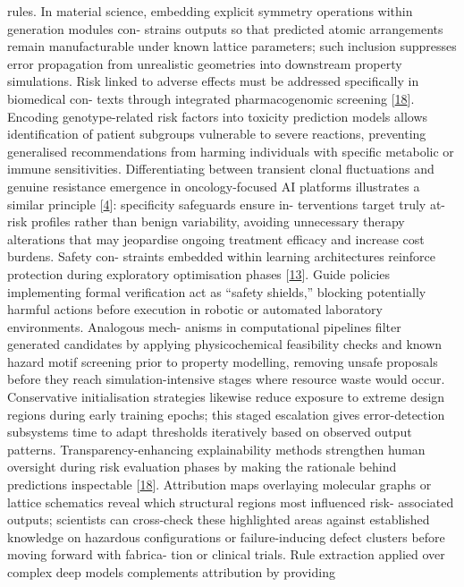 \documentclass[
]{article}
\begin{document}
rules. In material science, embedding explicit symmetry operations
within generation modules con- strains outputs so that predicted atomic
arrangements remain manufacturable under known lattice parameters; such
inclusion suppresses error propagation from unrealistic geometries into
downstream property simulations. Risk linked to adverse effects must be
addressed specifically in biomedical con- texts through integrated
pharmacogenomic screening {[}\hyperref[_bookmark58]{18}{]}. Encoding
genotype-related risk factors into toxicity prediction models allows
identification of patient subgroups vulnerable to severe reactions,
preventing generalised recommendations from harming individuals with
specific metabolic or immune sensitivities. Differentiating between
transient clonal fluctuations and genuine resistance emergence in
oncology-focused AI platforms illustrates a similar principle
{[}\hyperref[_bookmark44]{4}{]}: specificity safeguards ensure in-
terventions target truly at-risk profiles rather than benign
variability, avoiding unnecessary therapy alterations that may
jeopardise ongoing treatment efficacy and increase cost burdens. Safety
con- straints embedded within learning architectures reinforce
protection during exploratory optimisation phases
{[}\hyperref[_bookmark53]{13}{]}. Guide policies implementing formal
verification act as ``safety shields,'' blocking potentially harmful
actions before execution in robotic or automated laboratory
environments. Analogous mech- anisms in computational pipelines filter
generated candidates by applying physicochemical feasibility checks and
known hazard motif screening prior to property modelling, removing
unsafe proposals before they reach simulation-intensive stages where
resource waste would occur. Conservative initialisation strategies
likewise reduce exposure to extreme design regions during early training
epochs; this staged escalation gives error-detection subsystems time to
adapt thresholds iteratively based on observed output patterns.
Transparency-enhancing explainability methods strengthen human oversight
during risk evaluation phases by making the rationale behind predictions
inspectable {[}\hyperref[_bookmark58]{18}{]}. Attribution maps
overlaying molecular graphs or lattice schematics reveal which
structural regions most influenced risk- associated outputs; scientists
can cross-check these highlighted areas against established knowledge on
hazardous configurations or failure-inducing defect clusters before
moving forward with fabrica- tion or clinical trials. Rule extraction
applied over complex deep models complements attribution by providing
\end{document}
